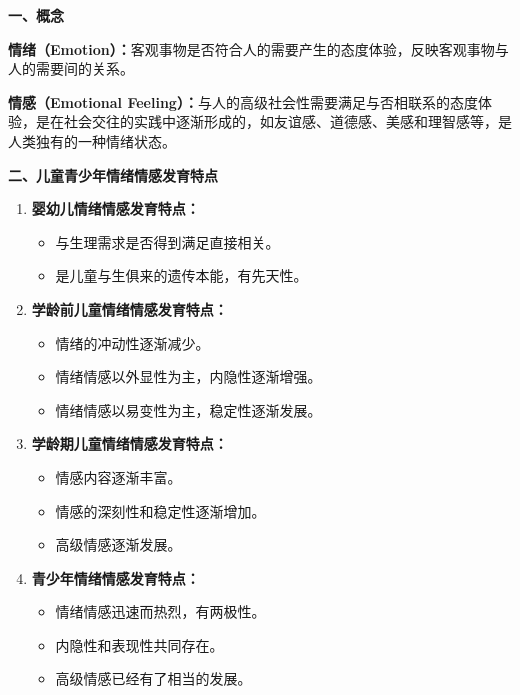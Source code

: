 \begin{defbox}
\textbf{一、概念}

\textbf{情绪（Emotion）：}客观事物是否符合人的需要产生的态度体验，反映客观事物与人的需要间的关系。

\textbf{情感（Emotional Feeling）：}与人的高级社会性需要满足与否相联系的态度体验，是在社会交往的实践中逐渐形成的，如友谊感、道德感、美感和理智感等，是人类独有的一种情绪状态。

\textbf{二、儿童青少年情绪情感发育特点}

\begin{enumerate}[leftmargin=*]
    \item \textbf{婴幼儿情绪情感发育特点：}
    \begin{itemize}[leftmargin=*]
        \item 与生理需求是否得到满足直接相关。
        \item 是儿童与生俱来的遗传本能，有先天性。
    \end{itemize}

    \item \textbf{学龄前儿童情绪情感发育特点：}
    \begin{itemize}[leftmargin=*]
        \item 情绪的冲动性逐渐减少。
        \item 情绪情感以外显性为主，内隐性逐渐增强。
        \item 情绪情感以易变性为主，稳定性逐渐发展。
    \end{itemize}

    \item \textbf{学龄期儿童情绪情感发育特点：}
    \begin{itemize}[leftmargin=*]
        \item 情感内容逐渐丰富。
        \item 情感的深刻性和稳定性逐渐增加。
        \item 高级情感逐渐发展。
    \end{itemize}

    \item \textbf{青少年情绪情感发育特点：}
    \begin{itemize}[leftmargin=*]
        \item 情绪情感迅速而热烈，有两极性。
        \item 内隐性和表现性共同存在。
        \item 高级情感已经有了相当的发展。
    \end{itemize}
\end{enumerate}
\end{defbox}

